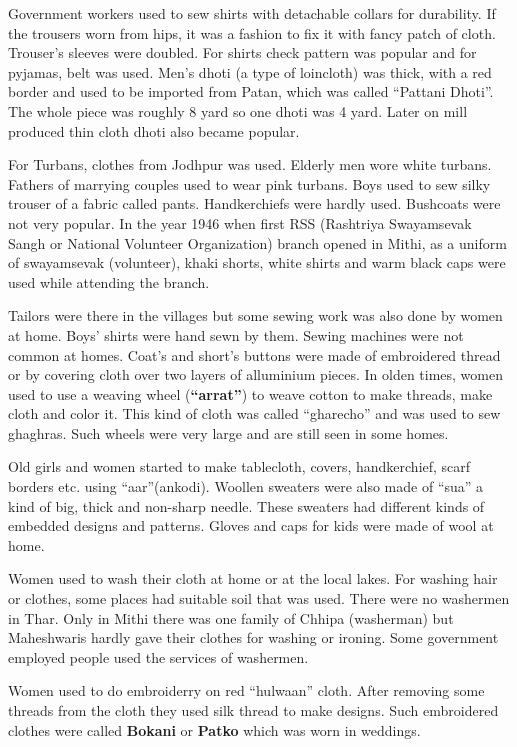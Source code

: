 Government workers used to sew shirts with detachable collars for durability.
If the trousers worn from hips, it was a fashion to fix it with fancy patch of
cloth. Trouser's sleeves were doubled. For shirts check pattern was popular and
for pyjamas, belt was used. Men's dhoti (a type of loincloth) was thick, with a
red border and used to be imported from Patan, which was called ``Pattani
Dhoti''. The whole piece was roughly 8 yard so one dhoti was 4 yard. Later on
mill produced thin cloth dhoti also became popular.

For Turbans, clothes from Jodhpur was used. Elderly men wore white turbans.
Fathers of marrying couples used to wear pink turbans. Boys used to sew silky
trouser of a fabric called pants. Handkerchiefs were hardly used. Bushcoats were
not very popular. In the year 1946 when first RSS (Rashtriya Swayamsevak Sangh
or National Volunteer Organization) branch opened in Mithi, as a uniform of
swayamsevak (volunteer), khaki shorts, white shirts and warm black caps were
used while attending the branch.

Tailors were there in the villages but some sewing work was also done by women
at home. Boys' shirts were hand sewn by them. Sewing machines were not common at
homes. Coat's and short's buttons were made of embroidered thread or by covering
cloth over two layers of alluminium pieces. In olden times, women used to use a
weaving wheel (\textbf{``arrat''}) to weave cotton to make threads, make cloth and color
it. This kind of cloth was called ``gharecho'' and was used to sew ghaghras.
Such wheels were very large and are still seen in some homes.

Old girls and women started to make tablecloth, covers, handkerchief, scarf
borders etc. using ``aar''(ankodi). Woollen sweaters were also made of ``sua'' a
kind of big, thick and non-sharp needle. These sweaters had different kinds of
embedded designs and patterns. Gloves and caps for kids were made of wool
at home.

Women used to wash their cloth at home or at the local lakes. For washing hair
or clothes, some places had suitable soil that was used. There were no washermen
in Thar. Only in Mithi there was one family of Chhipa (washerman) but
Maheshwaris hardly gave their clothes for washing or ironing. Some government
employed people used the services of washermen.

Women used to do embroiderry on red ``hulwaan'' cloth. After removing some
threads from the cloth they used silk thread to make designs. Such embroidered
clothes were called \textbf{Bokani} or \textbf{Patko} which was worn in
weddings.
